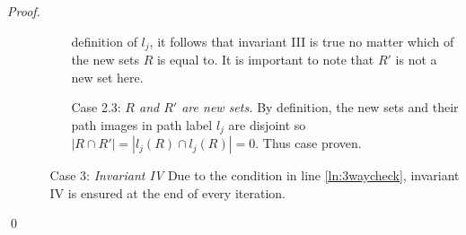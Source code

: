\documentclass[a4paper,UKenglish,numberwithinsect]{lipics}
\begin{document}
\begin{proof}
\begin{enumerate}
\begin{enumerate}
\begin{enumerate}
      definition of $l_j$, it follows that invariant III is true no matter which of
      the new sets $R$ is equal to. It is important to note that $R'$ is not a new set here.
    \item [Case 2.3:] {\em $R$ and $R'$ are new sets.} By definition,
      the new sets and their path images in path label $l_j$ are
      disjoint so $|R \cap R'| = |l_j(R) \cap l_j(R)| = 0$. Thus case
      proven.
    \end{enumerate}
  \item [Case 3:] {\em Invariant IV}
    Due to the condition in line \ref{ln:3waycheck}, invariant IV is
    ensured at the end of every iteration.
  \end{enumerate} 
\end{enumerate} 
\qed
\end{proof}
\end{document}
